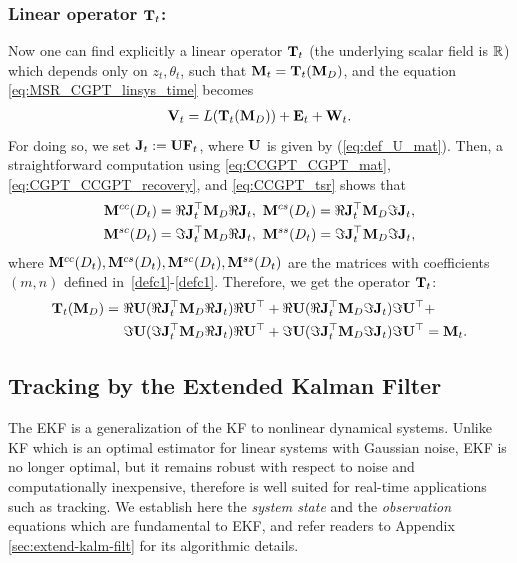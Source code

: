 \subsubsection*{Linear operator $\mathbf{T}_t$:}
Now one can find explicitly a linear operator $\mathbf{T}_t$ (the
underlying scalar field is $\R$) which depends only on $z_t,
\theta_t$, such that $\mathbf{M}_t=\mathbf{T}_t(\mathbf{M}_D)$, and the equation
\eqref{eq:MSR_CGPT_linsys_time} becomes
\begin{align}
  \label{eq:MSR_CGPT_linsys_time_Tt}
  \mathbf{V}_t = L(\mathbf{T}_t(\mathbf{M}_D)) + \mathbf{E}_t + \mathbf{W}_t .
\end{align}
For doing so, we set $\mathbf{J}_t := \mathbf{U}\mathbf{F}_t$, where $\mathbf{U}$ is given by
(\ref{eq:def_U_mat}). Then, a straightforward computation using
\eqref{eq:CCGPT_CGPT_mat}, \eqref{eq:CGPT_CCGPT_recovery}, and
\eqref{eq:CCGPT_tsr}  shows that
\begin{equation}
  \label{eq:CGPT_tsr}
  \begin{aligned}
    \mathbf{M}^{cc}(D_t) &= \Re \mathbf{J}_t^\top \mathbf{M}_D \Re \mathbf{J}_t, \ \mathbf{M}^{cs}(D_t) = \Re \mathbf{J}_t^\top \mathbf{M}_D \Im \mathbf{J}_t, \\
    \mathbf{M}^{sc}(D_t) &= \Im \mathbf{J}_t^\top \mathbf{M}_D \Re \mathbf{J}_t, \ \mathbf{M}^{ss}(D_t) = \Im \mathbf{J}_t^\top \mathbf{M}_D \Im
    \mathbf{J}_t,
  \end{aligned}
\end{equation}
where $\mathbf{M}^{cc}(D_t),\mathbf{M}^{cs}(D_t),\mathbf{M}^{sc}(D_t),\mathbf{M}^{ss}(D_t)$ are the matrices with 
coefficients $(m,n)$ defined in~\eqref{defc1}-\eqref{defc1}. Therefore, we get the
operator $\mathbf{T}_t$:
\begin{align}
  \label{eq:def_op_Tt}
  \mathbf{T}_t(\mathbf{M}_D) =\ &\Re \mathbf{U} (\Re \mathbf{J}_t^\top \mathbf{M}_D \Re \mathbf{J}_t) \Re \mathbf{U}^\top + \Re \mathbf{U} (\Re \mathbf{J}_t^\top
  \mathbf{M}_D \Im \mathbf{J}_t) \Im \mathbf{U}^\top + \notag \\
  &\Im \mathbf{U} (\Im \mathbf{J}_t^\top \mathbf{M}_D \Re \mathbf{J}_t) \Re \mathbf{U}^\top + \Im \mathbf{U} (\Im \mathbf{J}_t^\top \mathbf{M}_D \Im \mathbf{J}_t) \Im
  \mathbf{U}^\top = \mathbf{M}_t .
\end{align}

\subsection{Tracking by the Extended Kalman Filter}
\label{sec:track-extend-kalm} The EKF is a generalization of the
KF to nonlinear dynamical systems. Unlike KF which is an optimal
estimator for linear systems with Gaussian noise, EKF is no longer
optimal, but it remains robust with respect to noise and
computationally inexpensive, therefore is well suited for
real-time applications such as tracking. We establish here the
\emph{system state} and the \emph{observation} equations which are
fundamental to EKF, and refer readers to Appendix
\ref{sec:extend-kalm-filt} for its algorithmic details.

